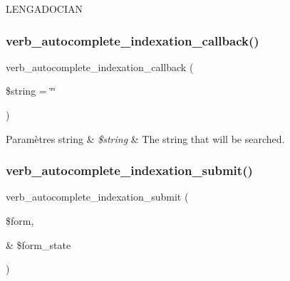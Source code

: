 L\+E\+N\+G\+A\+D\+O\+C\+I\+AN \hypertarget{conjoc__lengadocian__web_form_8inc_a378d4601a46c698692d26cb301470598}{}\label{conjoc__lengadocian__web_form_8inc_a378d4601a46c698692d26cb301470598} 
\subsubsection{\texorpdfstring{verb\+\_\+autocomplete\+\_\+indexation\+\_\+callback()}{verb\_autocomplete\_indexation\_callback()}}
{\footnotesize\ttfamily verb\+\_\+autocomplete\+\_\+indexation\+\_\+callback (\begin{DoxyParamCaption}\item[{}]{\$string = {\ttfamily \char`\"{}\char`\"{}} }\end{DoxyParamCaption})}


\begin{DoxyParams}[1]{Paramètres}
string & {\em \$string} & The string that will be searched. \\
\hline
\end{DoxyParams}
\hypertarget{conjoc__lengadocian__web_form_8inc_a5e7b0be9cab73b5b2be66499afd0edc5}{}\label{conjoc__lengadocian__web_form_8inc_a5e7b0be9cab73b5b2be66499afd0edc5} 
\subsubsection{\texorpdfstring{verb\+\_\+autocomplete\+\_\+indexation\+\_\+submit()}{verb\_autocomplete\_indexation\_submit()}}
{\footnotesize\ttfamily verb\+\_\+autocomplete\+\_\+indexation\+\_\+submit (\begin{DoxyParamCaption}\item[{}]{\$form,  }\item[{\&}]{\$form\+\_\+state }\end{DoxyParamCaption})}

